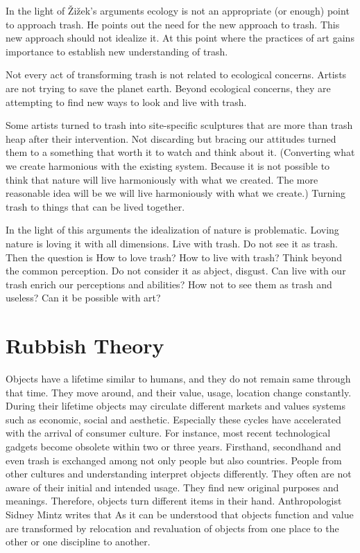In the light of Žižek’s arguments ecology is not an appropriate (or enough) point to approach trash. He points out the need for the new approach to trash. This new approach should not idealize it. At this point where the practices of art gains importance to establish new understanding of trash.

Not every act of transforming trash is not related to ecological concerns. Artists are not trying to save the planet earth. Beyond ecological concerns, they are attempting to find new ways to look and live with trash. 

Some artists turned to trash into site-specific sculptures that are more than trash heap after their intervention. Not discarding but bracing our attitudes turned them to a something that worth it to watch and think about it. (Converting what we create harmonious with the existing system. Because it is not possible to think that nature will live harmoniously with what we created. The more reasonable idea will be we will live harmoniously with what we create.) Turning trash to things that can be lived together.

In the light of this arguments the idealization of nature is problematic. Loving nature is loving it with all dimensions. Live with trash. Do not see it as trash. Then the question is How to love trash? How to live with trash? Think beyond the common perception. Do not consider it as abject, disgust. Can live with our trash enrich our perceptions and abilities? How not to see them as trash and useless? Can it be possible with art?



\section{Rubbish Theory}
Objects have a lifetime similar to humans, and they do not remain same through that time. They move around, and their value, usage, location change constantly. During their lifetime objects may circulate different markets and values systems such as economic, social and aesthetic. Especially these cycles have accelerated with the arrival of consumer culture. For instance, most recent technological gadgets become obsolete within two or three years. Firsthand, secondhand and even trash is exchanged among not only people but also countries. People from other cultures and understanding interpret objects differently. They often are not aware of their initial and intended usage. They find new original purposes and meanings. Therefore, objects turn different items in their hand. Anthropologist Sidney Mintz \citep[as cited in][]{strasser1999waste} writes that  As it can be understood that objects function and value are transformed by relocation and revaluation of objects from one place to the other or one discipline to another. 

